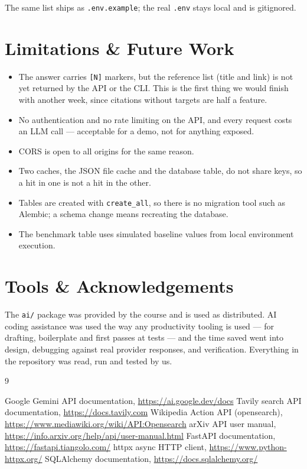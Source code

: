 \documentclass[11pt,a4paper]{article}
\newcommand{\code}[1]{\texttt{\small #1}}
\begin{document}
\noindent The same list ships as \code{.env.example}; the real \code{.env} stays
local and is gitignored.

\section{Limitations \& Future Work}
\label{sec:limits}
\begin{itemize}[leftmargin=1.4em,itemsep=3pt]
  \item The answer carries \code{[N]} markers, but the reference list (title and
        link) is not yet returned by the API or the CLI. This is the first thing
        we would finish with another week, since citations without targets are
        half a feature.
  \item No authentication and no rate limiting on the API, and every request
        costs an LLM call --- acceptable for a demo, not for anything exposed.
  \item CORS is open to all origins for the same reason.
  \item Two caches, the JSON file cache and the database table, do not share
        keys, so a hit in one is not a hit in the other.
  \item Tables are created with \code{create\_all}, so there is no migration
        tool such as Alembic; a schema change means recreating the database.
  \item The benchmark table uses simulated baseline values from local environment execution.
\end{itemize}

\section{Tools \& Acknowledgements}
The \code{ai/} package was provided by the course and is used as distributed.
AI coding assistance was used the way any productivity tooling is used --- for
drafting, boilerplate and first passes at tests --- and the time saved went into
design, debugging against real provider responses, and verification. Everything
in the repository was read, run and tested by us.

\begin{thebibliography}{9}
 Google Gemini API documentation, \url{https://ai.google.dev/docs}
 Tavily search API documentation, \url{https://docs.tavily.com}
 Wikipedia Action API (opensearch), \url{https://www.mediawiki.org/wiki/API:Opensearch}
 arXiv API user manual, \url{https://info.arxiv.org/help/api/user-manual.html}
 FastAPI documentation, \url{https://fastapi.tiangolo.com/}
 httpx async HTTP client, \url{https://www.python-httpx.org/}
 SQLAlchemy documentation, \url{https://docs.sqlalchemy.org/}
\end{thebibliography}
\end{document}
